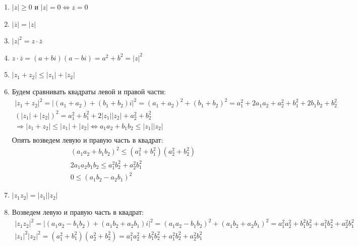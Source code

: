 \documentclass[12pt,letterpaper]{report}
\makeatletter
\theoremstyle{definition}
\renewenvironment{proof}[1][\proofname]{%
   \par\pushQED{\qed}\normalfont%
   \topsep6\p@\@plus6\p@\relax
   \trivlist\item[\hskip\labelsep\bfseries#1\@addpunct{.}]%
   \ignorespaces
}{%
   \popQED\endtrivlist\@endpefalse
}
\makeatother
\begin{document}
\begin{enumerate}
  \item $|z| \geqslant 0$ и $|z| = 0 \Leftrightarrow z = 0$
  \item $|\overline{z}| = |z|$
  \item $|z|^2 = z \cdot \overline{z}$
  \begin{proof}
    $z \cdot \overline{z} = (a + bi)(a - bi) = a^2 + b^2 = |z|^2$
  \end{proof}
  \item $|z_1 + z_2| \leqslant |z_1| + |z_2|$
  \begin{proof}
    Будем сравнивать квадраты левой и правой части:
    \begin{gather*}
      |z_1 + z_2|^2 = |(a_1 + a_2) + (b_1 + b_2)i|^2 = (a_1 + a_2)^2 + (b_1 + b_2)^2 = a_1^2 + 2a_1a_2 + a_2^2 + b_1^2 + 2b_1b_2 + b_2^2 \\
      (|z_1| + |z_2|)^2 = a_1^2 + b_1^2 + 2|z_1||z_2|  + a_2^2 + b_2^2 \\
      \Longrightarrow |z_1 + z_2| \leqslant |z_1| + |z_2| \Leftrightarrow a_1a_2 + b_1b_2 \leqslant |z_1||z_2| \\
    \end{gather*}
    Опять возведем левую и правую часть в квадрат:
    \begin{gather*}
      (a_1a_2 + b_1b_2)^2 \leqslant (a_1^2 + b_1^2)(a_2^2 + b_2^2) \\
      2a_1a_2b_1b_2 \leqslant a_1^2b_2^2 + a_2^2b_1^2 \\
      0 \leqslant (a_1b_2 - a_2b_1)^2
    \end{gather*}
  \end{proof}
  \item $|z_1z_2| = |z_1||z_2|$
  \begin{proof}
    Возведем левую и правую часть в квадрат:
    \begin{gather*}
      |z_1z_2|^2 = |(a_1a_2 - b_1b_2) + (a_1b_2 + a_2b_1)i|^2 = (a_1a_2 - b_1b_2)^2 + (a_1b_2 + a_2b_1)^2 = a_1^2a_2^2 + b_1^2b_2^2 + a_1^2b_2^2 + a_2^2b_1^2 \\
      |z_1|^2|z_2|^2 = (a_1^2 + b_1^2)(a_2^2 + b_2^2) = a_1^2a_2^2 + b_1^2b_2^2 + a_1^2b_2^2 + a_2^2b_1^2
    \end{gather*}
  \end{proof}
\end{enumerate}
\end{document}
